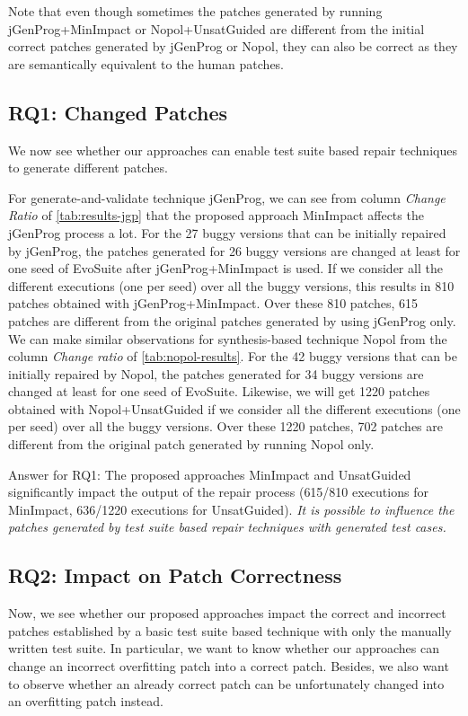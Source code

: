\documentclass[]{sig-alternate}
\begin{document}
Note that even though sometimes the patches generated by running jGenProg+MinImpact or Nopol+UnsatGuided are different from the initial correct patches generated by jGenProg or Nopol, they can also be correct as they are semantically equivalent to the human patches.

\subsection{RQ1: Changed Patches}

We now see whether our approaches can enable test suite based repair techniques to generate different patches.

For generate-and-validate technique jGenProg, we can see from column \emph{Change Ratio} of \autoref{tab:results-jgp} that the proposed approach MinImpact affects the jGenProg process a lot. For the 27 buggy versions that can be initially repaired by jGenProg, the patches generated for 26 buggy versions are changed at least for one seed of EvoSuite after jGenProg+MinImpact is used. If we consider all the different executions (one per seed) over all the buggy versions, this results in 810 patches obtained with jGenProg+MinImpact. Over these 810 patches, 615 patches are different from the original patches generated by using jGenProg only.
We can make similar observations for synthesis-based technique Nopol from the column \emph{Change ratio} of \autoref{tab:nopol-results}. For the 42 buggy versions that can be initially repaired by Nopol, the patches generated for 34 buggy versions are changed at least for one seed of EvoSuite. Likewise, we will get 1220 patches obtained with Nopol+UnsatGuided if we consider all the different executions (one per seed) over all the buggy versions. Over these 1220 patches, 702 patches are different from the original patch generated by running Nopol only. 

Answer for RQ1: The proposed approaches MinImpact and UnsatGuided significantly impact the output of the repair process ({615/810} executions for MinImpact, 636/1220 executions for UnsatGuided).
\emph{It is possible to influence the patches generated by test suite based repair techniques with generated test cases.} 

\subsection{RQ2: Impact on Patch Correctness}

Now, we see whether our proposed approaches impact the correct and incorrect patches established by a basic test suite based technique with only the manually written test suite. In particular, we want to know whether our approaches can change an incorrect overfitting patch into a correct patch. Besides, we also want to observe whether an already correct patch can be unfortunately changed into an overfitting patch instead.
\end{document}
